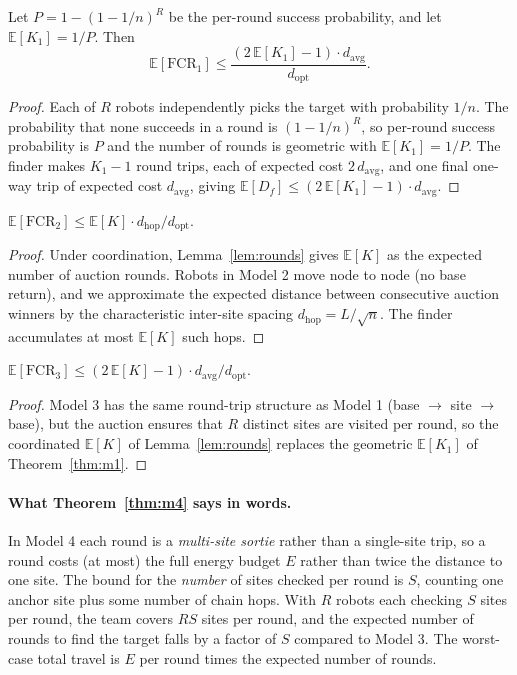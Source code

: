 \begin{doublespacing}
\begin{theorem}\label{thm:m1}
Let $P = 1 - (1 - 1/n)^R$ be the per-round success probability, and
let $\mathbb{E}[K_1] = 1/P$. Then
\[
  \mathbb{E}[\mathrm{FCR}_1] \leq \frac{(2\,\mathbb{E}[K_1] - 1) \cdot d_{\mathrm{avg}}}{d_{\mathrm{opt}}}.
\]
\end{theorem}

\begin{proof}
Each of $R$ robots independently picks the target with probability
$1/n$. The probability that none succeeds in a round is $(1 - 1/n)^R$,
so per-round success probability is $P$ and the number of rounds is
geometric with $\mathbb{E}[K_1] = 1/P$. The finder makes $K_1 - 1$
round trips, each of expected cost $2\,d_{\mathrm{avg}}$, and one
final one-way trip of expected cost $d_{\mathrm{avg}}$, giving
$\mathbb{E}[D_f] \leq (2\,\mathbb{E}[K_1] - 1) \cdot d_{\mathrm{avg}}$.
\end{proof}

\begin{theorem}\label{thm:m2}
$
  \mathbb{E}[\mathrm{FCR}_2] \leq \mathbb{E}[K] \cdot d_{\mathrm{hop}} / d_{\mathrm{opt}}.
$
\end{theorem}

\begin{proof}
Under coordination, Lemma~\ref{lem:rounds} gives $\mathbb{E}[K]$ as
the expected number of auction rounds. Robots in Model 2 move
node to node (no base return), and we approximate the expected
distance between consecutive auction winners by the characteristic
inter-site spacing $d_{\mathrm{hop}} = L/\sqrt{n}$. The finder
accumulates at most $\mathbb{E}[K]$ such hops.
\end{proof}

\begin{theorem}\label{thm:m3}
$
  \mathbb{E}[\mathrm{FCR}_3] \leq (2\,\mathbb{E}[K] - 1) \cdot d_{\mathrm{avg}} / d_{\mathrm{opt}}.
$
\end{theorem}

\begin{proof}
Model 3 has the same round-trip structure as Model 1 (base $\to$ site
$\to$ base), but the auction ensures that $R$ distinct sites are
visited per round, so the coordinated $\mathbb{E}[K]$ of
Lemma~\ref{lem:rounds} replaces the geometric $\mathbb{E}[K_1]$ of
Theorem~\ref{thm:m1}.
\end{proof}

\paragraph{What Theorem~\ref{thm:m4} says in words.} In Model 4
each round is a \emph{multi-site sortie} rather than a single-site
trip, so a round costs (at most) the full energy budget $E$ rather
than twice the distance to one site. The bound for the
\emph{number} of sites checked per round is $S$, counting one anchor
site plus some number of chain hops. With $R$ robots each checking
$S$ sites per round, the team covers $RS$ sites per round, and the
expected number of rounds to find the target falls by a factor of
$S$ compared to Model 3. The worst-case total travel is $E$ per
round times the expected number of rounds.


\end{doublespacing}
